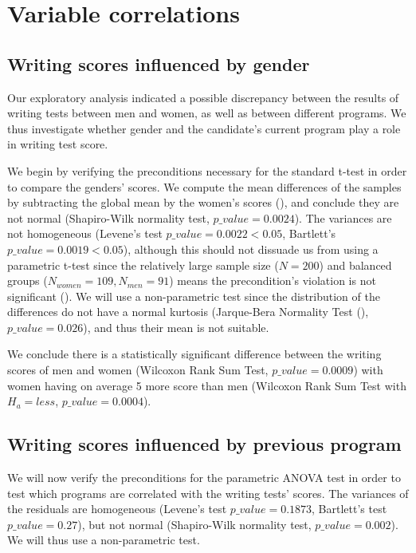 \documentclass[10pt, a4paper]{article}
\begin{document}
	\section{Variable correlations}
	\label{sec::var_cors}
	
	\subsection{Writing scores influenced by gender}
	Our exploratory analysis indicated a possible discrepancy between the results of writing tests between men and women, as well as between different programs. We thus investigate whether gender and the candidate's current program play a role in writing test score.
	
	We begin by verifying the preconditions necessary for the standard t-test in order to compare the genders' scores. We compute the mean differences of the samples by subtracting the global mean by the women's scores (\textcite{means}), and conclude they are not normal (Shapiro-Wilk normality test, $p\_value = 0.0024$). The variances are not homogeneous (Levene's test $p\_value = 0.0022 < 0.05$, Bartlett's $p\_value = 0.0019 < 0.05$), although this should not dissuade us from using a parametric t-test since the relatively large sample size ($N=200$) and balanced groups ($N_{women} = 109, N_{men} = 91$) means the precondition's violation is not significant (\textcite{variances}). We will use a non-parametric test since the distribution of the differences do not have a normal kurtosis (Jarque-Bera Normality Test (\textcite{jarque}), $p\_value=0.026$), and thus their mean is not suitable.
	
	We conclude there is a statistically significant difference between the writing scores of men and women (Wilcoxon Rank Sum Test, $p\_value = 0.0009$) with women having on average 5 more score than men (Wilcoxon Rank Sum Test with $H_a = less$, $p\_value = 0.0004$).
	
	
	\subsection{Writing scores influenced by previous program}
	We will now verify the preconditions for the parametric ANOVA test in order to test which programs are correlated with the writing tests' scores. The variances of the residuals are homogeneous (Levene's test $p\_value = 0.1873$, Bartlett's test $p\_value = 0.27$), but not normal (Shapiro-Wilk normality test, $p\_value = 0.002$). We will thus use a non-parametric test.
	
\end{document}
